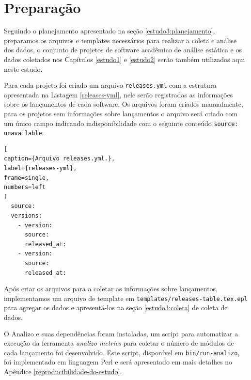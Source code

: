

\section{Preparação} \label{estudo3:preparacao} %

Seguindo o planejamento apresentado na seção \ref{estudo3:planejamento},
preparamos os arquivos e templates necessários para realizar a coleta e análise
dos dados, o conjunto de projetos de software acadêmico de análise estática e
os dados coletados nos Capítulos \ref{estudo1} e \ref{estudo2} serão também
utilizados aqui neste estudo.

Para cada projeto foi criado um arquivo \texttt{releases.yml} com a estrutura
apresentada na Listagem \ref{releases-yml}, nele serão registradas as
informações sobre os lançamentos de cada software. Os arquivos foram criados
manualmente, para os projetos sem informações sobre lançamentos o arquivo será
criado com um único campo indicando indisponibilidade com o seguinte conteúdo
\texttt{source: unavailable}.

\begin{lstlisting}[
caption={Arquivo releases.yml.},
label={releases-yml},
frame=single,
numbers=left
]
  source:
  versions:
    - version:
      source:
      released_at:
    - version:
      source:
      released_at:
\end{lstlisting}

Após criar os arquivos para a coletar as informações sobre lançamentos,
implementamos um arquivo de template em
\texttt{templates/releases-table.tex.epl} para agregar os dados e apresentá-los
na seção \ref{estudo3:coleta} de coleta de dados.


O Analizo e suas dependências foram instaladas, um script para automatizar a
execução da ferramenta {\it analizo metrics} para coletar o número de módulos
de cada lançamento foi desenvolvido. Este script, disponível em
\texttt{bin/run-analizo}, foi implementado em linguagem Perl e será apresentado
em mais detalhes no Apêndice \ref{reproducibilidade-do-estudo}.


